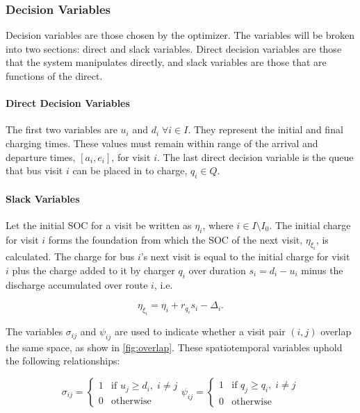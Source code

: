 \documentclass[energies,article,submit,moreauthors]{Definitions/mdpi}
\newcommand{\Iset}{I}                       %
\newcommand{\Qset}{Q}                       %
\begin{document}
\subsubsection{Decision Variables}
\label{sec:decision-variables}
Decision variables are those chosen by the optimizer. The variables will be broken into two sections: direct and slack
variables. Direct decision variables are those that the system manipulates directly, and slack variables are those that
are functions of the direct.

\paragraph{Direct Decision Variables}
\label{sec:direct-decision-variables}
The first two variables are \(u_i\) and \(d_i \; \forall i \in \Iset\). They represent the initial and final charging times. These
values must remain within range of the arrival and departure times, \([a_i, e_i]\), for visit \(i\). The last direct
decision variable is the queue that bus visit \(i\) can be placed in to charge, \(q_i \in \Qset\).

\paragraph{Slack Variables}
\label{sec:slack-decision-variables}
Let the initial SOC for a visit be written as \(\eta_i\), where \(i \in \Iset \setminus \Iset_0\). The initial charge for visit \(i\) forms
the foundation from which the SOC of the next visit, \(\eta_{\xi_i}\), is calculated. The charge for bus \(i\)'s next visit is
equal to the initial charge for visit \(i\) plus the charge added to it by charger \(q_i\) over duration \(s_i = d_i - u_i\)
minus the discharge accumulated over route \(i\), i.e.

\begin{equation}
\label{eq:bat-chain}
  \eta_{\xi_i} = \eta_i + r_{q_i}s_i - \Delta_i\text{.}
\end{equation}

The variables \(\sigma_{ij}\) and \(\psi_{ij}\) are used to indicate whether a visit pair \((i, j)\) overlap the same space, as show
in \ref{fig:overlap}. These spatiotemporal variables uphold the following relationships:

\begin{subequations}
\label{eq:bus-spat-temp}
\begin{equation}
  \sigma_{ij} =
  \begin{cases}
    1 & \text{if } u_j \ge d_i, \; i \ne j\\
    0 & \text{otherwise}
  \end{cases}
\end{equation}

\begin{equation}
  \psi_{ij} =
  \begin{cases}
    1 & \text{if } q_j \ge q_i,\; i \ne j\\
    0 & \text{otherwise}
  \end{cases}
\end{equation}
\end{subequations}
\end{document}
